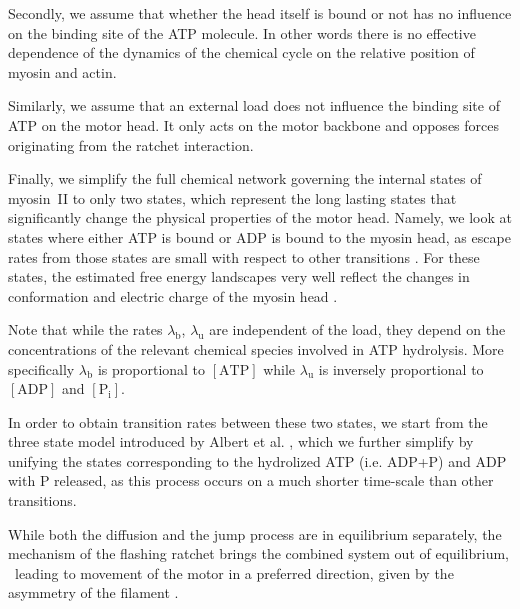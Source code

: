 \documentclass[aps,pre,twocolumn,showpacs,showkeys,superscriptaddress,floatfix]{revtex4-1}
\begin{document}
Secondly, we assume that whether the head itself is bound or not has no influence on the binding site of the ATP molecule.  In other words
 there is no effective dependence of the dynamics of the chemical cycle on the relative position of myosin and actin. 

Similarly, we assume that an external load does not influence the binding site of ATP on the motor head. 
It only acts on the motor backbone and opposes forces originating from the ratchet interaction. %

Finally, we simplify the full chemical network governing the internal states of myosin~II \cite{Bierbaum2011,Bierbaum2013} to only two states,  
which represent the long lasting states that significantly change the physical properties of the motor head.
Namely, we look at states where either ATP is bound or ADP  is bound to the myosin head, 
as escape rates from those states are small with respect to other transitions \cite{Bierbaum2011}. 
For these states, the estimated free energy landscapes \cite{Nie2014,nie2014conformational} very well reflect the changes in conformation and electric charge of the myosin head \cite{barterls1993myosin}.

Note that while the rates $\lambda_\text{b}$, $\lambda_\text{u}$ are independent of the load, 
they depend on the concentrations of the relevant chemical species involved in ATP hydrolysis. 
More specifically $\lambda_\text{b}$ is proportional to $[\text{ATP}]$ while $\lambda_\text{u}$ is inversely proportional to $[\text{ADP}]$ and $[\text{P}_\text{i}]$.

In order to obtain transition rates between these two states, we start from the three state model introduced by Albert et al. \cite{Albert2014},
which we further simplify by unifying the states corresponding to the hydrolized ATP (i.e. ADP+P) and ADP with P released, 
as this process occurs on a much shorter time-scale than other transitions.

While both the diffusion and the jump process are in equilibrium separately, 
the mechanism of the flashing ratchet brings the combined system out of equilibrium, \
leading to movement of the motor in a preferred direction, given by the asymmetry of the filament \cite{Reimann2002introduction,de2007symmetries}.
\end{document}
